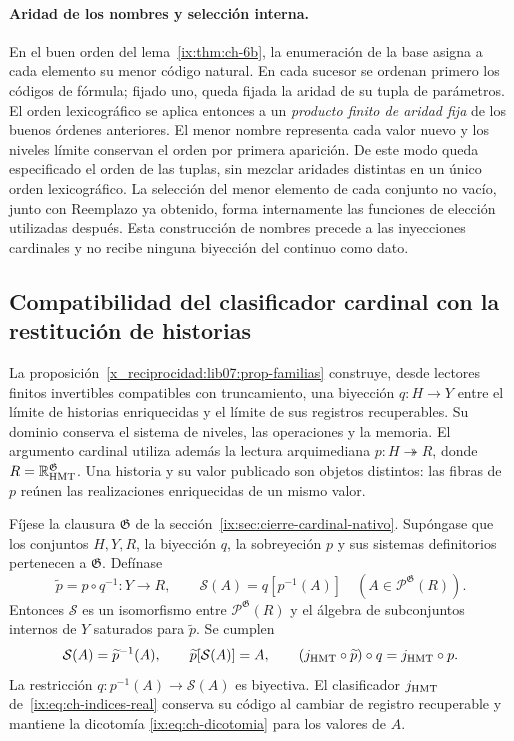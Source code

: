 \paragraph{Aridad de los nombres y selección interna.}
En el buen orden del lema~\ref{ix:thm:ch-6b}, la enumeración de la base
asigna a cada elemento su menor código natural. En cada sucesor se ordenan
primero los códigos de fórmula; fijado uno, queda fijada la aridad de su
tupla de parámetros. El orden lexicográfico se aplica entonces a un
\emph{producto finito de aridad fija} de los buenos órdenes anteriores.
El menor nombre representa cada valor nuevo y los niveles límite conservan
el orden por primera aparición. De este modo queda especificado el orden
de las tuplas, sin mezclar aridades distintas en un único orden
lexicográfico. La selección del menor elemento de cada conjunto no vacío,
junto con Reemplazo ya obtenido, forma internamente las funciones de
elección utilizadas después. Esta construcción de nombres precede a las
inyecciones cardinales y no recibe ninguna biyección del continuo como
dato.

\subsection{Compatibilidad del clasificador cardinal con la restitución de historias}
\label{empalme:clasificador-restitucion}

La proposición~\ref{x_reciprocidad:lib07:prop-familias} construye, desde
lectores finitos invertibles compatibles con truncamiento, una biyección
\(q:H\to Y\) entre el límite de historias enriquecidas y el límite de sus
registros recuperables. Su dominio conserva el sistema de niveles, las
operaciones y la memoria. El argumento cardinal utiliza además la lectura
arquimediana \(p:H\twoheadrightarrow R\), donde
\(R=\mathbb R_{\rm HMT}^{\mathfrak G}\). Una historia y su valor
publicado son objetos distintos: las fibras de \(p\) reúnen las
realizaciones enriquecidas de un mismo valor.

\begin{proposition}
\label{empalme:prop-fibras-codigo}
Fíjese la clausura \(\mathfrak G\) de la sección~\ref{ix:sec:cierre-cardinal-nativo}.
Supóngase que los conjuntos \(H,Y,R\), la biyección \(q\), la
sobreyeción \(p\) y sus sistemas definitorios pertenecen a
\(\mathfrak G\). Defínase
\[
 \widetilde p=p\circ q^{-1}:Y\longrightarrow R,
 \qquad
 \mathcal S(A)=q[p^{-1}(A)]
 \quad(A\in\mathcal P^{\mathfrak G}(R)).
\]
Entonces \(\mathcal S\) es un isomorfismo entre
\(\mathcal P^{\mathfrak G}(R)\) y el álgebra de subconjuntos internos
de \(Y\) saturados para \(\widetilde p\). Se cumplen
\[
 \mathcal S(A)=\widetilde p^{-1}(A),\qquad
 \widetilde p[\mathcal S(A)]=A,
 \qquad
 (j_{\rm HMT}\circ\widetilde p)\circ q=j_{\rm HMT}\circ p.
\]
La restricción \(q:p^{-1}(A)\to\mathcal S(A)\) es biyectiva. El
clasificador \(j_{\rm HMT}\) de~\eqref{ix:eq:ch-indices-real} conserva
su código al cambiar de registro recuperable y mantiene la dicotomía
\eqref{ix:eq:ch-dicotomia} para los valores de \(A\).
\end{proposition}

